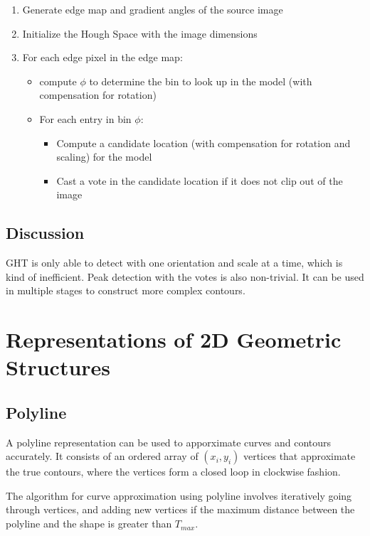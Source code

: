\documentclass{article}
\begin{document}
\begin{multicols}{3}
\begin{enumerate}
\itemsep0em
\item Generate edge map and gradient angles of the source image
\item Initialize the Hough Space with the image dimensions
\item For each edge pixel in the edge map:
\begin{itemize}
\itemsep0em
        \item compute $\phi$ to determine the bin to look up in the model (with compensation for rotation)
        \item For each entry in bin $\phi$:
        \begin{itemize}
        \itemsep0em
                \item Compute a candidate location (with compensation for rotation and scaling) for the model
                \item Cast a vote in the candidate location if it does not clip out of the image
        \end{itemize}
\end{itemize}
\end{enumerate}

\subsection{Discussion}

GHT is only able to detect with one orientation and scale at a time, which is kind of inefficient. Peak detection with the votes is also non-trivial. It can be used in multiple stages to construct more complex contours.

\section{Representations of 2D Geometric Structures}
\subsection{Polyline}

A polyline representation can be used to apporximate curves and contours accurately. It consists of an ordered array of $(x_i, y_i)$ vertices that approximate the true contours, where the vertices form a closed loop in clockwise fashion.

The algorithm for curve approximation using polyline involves iteratively going through vertices, and adding new vertices if the maximum distance between the polyline and the shape is greater than $T_{max}$.


\end{multicols}
\end{document}
